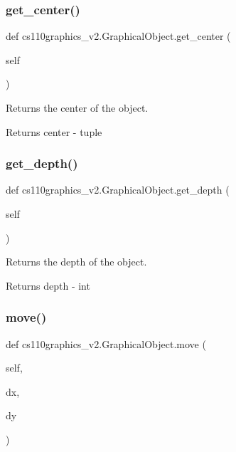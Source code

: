\subsubsection{\texorpdfstring{get\_center()}{get\_center()}}
{\footnotesize\ttfamily def cs110graphics\+\_\+v2.\+Graphical\+Object.\+get\+\_\+center (\begin{DoxyParamCaption}\item[{}]{self }\end{DoxyParamCaption})}



Returns the center of the object. 

\begin{DoxyReturn}{Returns}
center -\/ tuple 
\end{DoxyReturn}
\mbox{\label{classcs110graphics__v2_1_1GraphicalObject_a58c0dc91ebad6f07d6e175b1fd117bf4}} 
\subsubsection{\texorpdfstring{get\_depth()}{get\_depth()}}
{\footnotesize\ttfamily def cs110graphics\+\_\+v2.\+Graphical\+Object.\+get\+\_\+depth (\begin{DoxyParamCaption}\item[{}]{self }\end{DoxyParamCaption})}



Returns the depth of the object. 

\begin{DoxyReturn}{Returns}
depth -\/ int 
\end{DoxyReturn}
\mbox{\label{classcs110graphics__v2_1_1GraphicalObject_a7f6cb53a1fb328404d842685336b89e4}} 
\subsubsection{\texorpdfstring{move()}{move()}}
{\footnotesize\ttfamily def cs110graphics\+\_\+v2.\+Graphical\+Object.\+move (\begin{DoxyParamCaption}\item[{}]{self,  }\item[{}]{dx,  }\item[{}]{dy }\end{DoxyParamCaption})}



